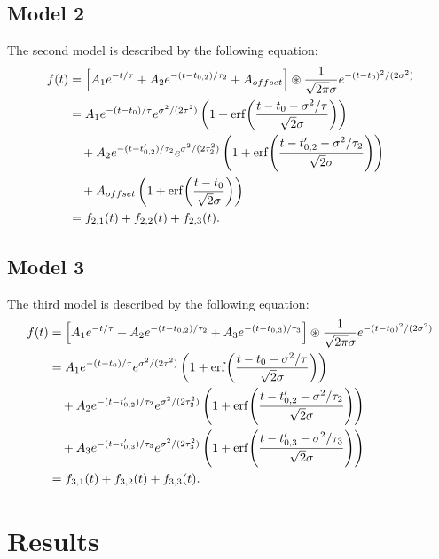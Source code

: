 \documentclass[12pt,a4paper]{report}
\begin{document}
\section{Model 2}
The second model is described by the following equation:
\begin{align}
    \begin{split}
    f(t)
    &= \qty[A_1 e^{-t/\tau} + A_2 e^{-(t-t_{0,2})/\tau_2} + A_{offset}]
    \circledast \frac{1}{\sqrt{2\pi}\sigma} e^{-(t-t_0)^2/(2\sigma^2)} \\
    &= A_1 e^{-(t-t_0)/\tau} e^{\sigma^2/(2\tau^2)}
    \left(1 + \erf\!\left(\frac{t-t_0-\sigma^2/\tau}{\sqrt{2}\sigma}\right)\right) \\
    &\quad + A_2 e^{-(t-t'_{0,2})/\tau_2} e^{\sigma^2/(2\tau_2^2)}
    \left(1 + \erf\!\left(\frac{t-t'_{0,2}-\sigma^2/\tau_2}{\sqrt{2}\sigma}\right)\right) \\
    &\quad + A_{offset} \left(1 + \erf\!\left(\frac{t-t_0}{\sqrt{2}\sigma}\right)\right)\\
    &= f_{2,1}(t) + f_{2,2}(t) + f_{2,3}(t).
    \end{split}
    \end{align}

\section{Model 3}
The third model is described by the following equation:
\begin{align}
    \begin{split}
    f(t)
    &= \qty[A_1 e^{-t/\tau} + A_2 e^{-(t-t_{0,2})/\tau_2} + A_3 e^{-(t-t_{0,3})/\tau_3}]
    \circledast \frac{1}{\sqrt{2\pi}\sigma} e^{-(t-t_0)^2/(2\sigma^2)} \\
    &= A_1 e^{-(t-t_0)/\tau} e^{\sigma^2/(2\tau^2)}
    \left(1 + \erf\!\left(\frac{t-t_0-\sigma^2/\tau}{\sqrt{2}\sigma}\right)\right) \\
    &\quad + A_2 e^{-(t-t'_{0,2})/\tau_2} e^{\sigma^2/(2\tau_2^2)}
    \left(1 + \erf\!\left(\frac{t-t'_{0,2}-\sigma^2/\tau_2}{\sqrt{2}\sigma}\right)\right) \\
    &\quad + A_3 e^{-(t-t'_{0,3})/\tau_3} e^{\sigma^2/(2\tau_3^2)}
    \left(1 + \erf\!\left(\frac{t-t'_{0,3}-\sigma^2/\tau_3}{\sqrt{2}\sigma}\right)\right)\\
    &= f_{3,1}(t) + f_{3,2}(t) + f_{3,3}(t).
    \end{split}
    \end{align}

\chapter{Results}
\end{document}
